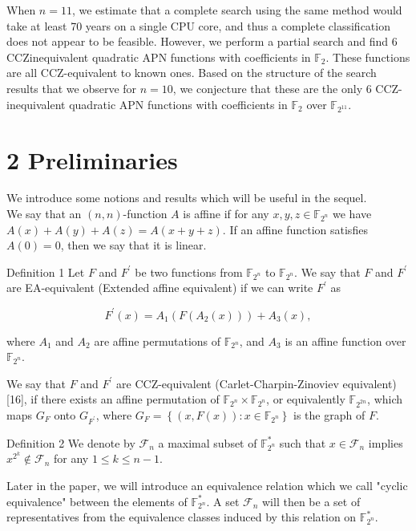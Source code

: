 \documentclass[10pt]{article}
\begin{document}
When $n=11$, we estimate that a complete search using the same method would take at least 70 years on a single CPU core, and thus a complete classification does not appear to be feasible. However, we perform a partial search and find 6 CCZinequivalent quadratic APN functions with coefficients in $\mathbb{F}_{2}$. These functions are all CCZ-equivalent to known ones. Based on the structure of the search results that we observe for $n=10$, we conjecture that these are the only 6 CCZ-inequivalent quadratic APN functions with coefficients in $\mathbb{F}_{2}$ over $\mathbb{F}_{2^{11}}$.

\section*{2 Preliminaries}
We introduce some notions and results which will be useful in the sequel.\\
We say that an $(n, n)$-function $A$ is affine if for any $x, y, z \in \mathbb{F}_{2^{n}}$ we have $A(x)+A(y)+A(z)=A(x+y+z)$. If an affine function satisfies $A(0)=0$, then we say that it is linear.

Definition 1 Let $F$ and $F^{\prime}$ be two functions from $\mathbb{F}_{2^{n}}$ to $\mathbb{F}_{2^{n}}$. We say that $F$ and $F^{\prime}$ are EA-equivalent (Extended affine equivalent) if we can write $F^{\prime}$ as

$$
F^{\prime}(x)=A_{1}\left(F\left(A_{2}(x)\right)\right)+A_{3}(x),
$$

where $A_{1}$ and $A_{2}$ are affine permutations of $\mathbb{F}_{2^{n}}$, and $A_{3}$ is an affine function over $\mathbb{F}_{2^{n}}$.

We say that $F$ and $F^{\prime}$ are CCZ-equivalent (Carlet-Charpin-Zinoviev equivalent) [16], if there exists an affine permutation of $\mathbb{F}_{2^{n}} \times \mathbb{F}_{2^{n}}$, or equivalently $\mathbb{F}_{2^{2 n}}$, which maps $G_{F}$ onto $G_{F^{\prime}}$, where $G_{F}=\left\{(x, F(x)): x \in \mathbb{F}_{2^{n}}\right\}$ is the graph of $F$.

Definition 2 We denote by $\mathcal{F}_{n}$ a maximal subset of $\mathbb{F}_{2^{n}}^{*}$ such that $x \in \mathcal{F}_{n}$ implies $x^{2^{k}} \notin \mathcal{F}_{n}$ for any $1 \leq k \leq n-1$.

Later in the paper, we will introduce an equivalence relation which we call "cyclic equivalence" between the elements of $\mathbb{F}_{2^{n}}^{*}$. A set $\mathcal{F}_{n}$ will then be a set of representatives from the equivalence classes induced by this relation on $\mathbb{F}_{2^{n}}^{*}$.
\end{document}
